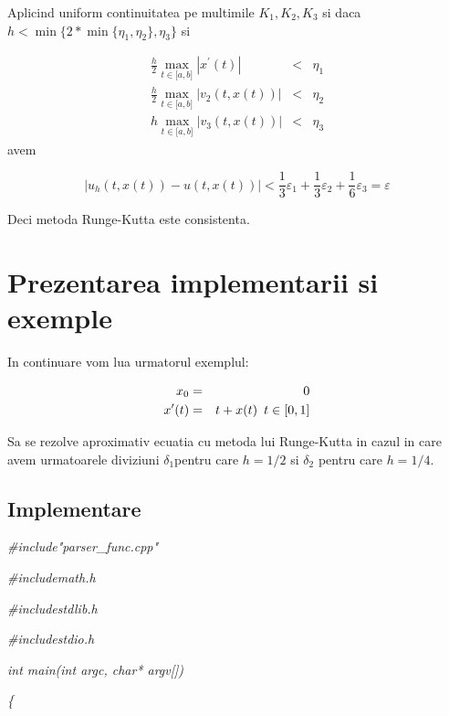 \documentclass[a4paper,twoside]{book}
\begin{document}
Aplicind uniform continuitatea pe multimile $K_{1},K_{2},K_{3}$ si daca $%
h<\min \{2\ast \min \{\eta _{1},\eta _{2}\},\eta _{3}\}$ si

\begin{eqnarray*}
\frac{h}{2}\max_{t\in \lbrack a,b]}\left\vert x^{\prime }(t)\right\vert
&<&\eta _{1} \\
\frac{h}{2}\max_{t\in \lbrack a,b]}\left\vert v_{2}(t,x(t))\right\vert
&<&\eta _{2} \\
h\max_{t\in \lbrack a,b]}\left\vert v_{3}(t,x(t))\right\vert &<&\eta _{3}
\end{eqnarray*}%
avem

\begin{equation*}
\left\vert u_{h}(t,x(t))-u(t,x(t))\right\vert <\frac{1}{3}\varepsilon _{1}+%
\frac{1}{3}\varepsilon _{2}+\frac{1}{6}\varepsilon _{3}=\varepsilon
\end{equation*}

Deci metoda Runge-Kutta este consistenta.

\section{Prezentarea implementarii si exemple}

In continuare vom lua urmatorul exemplul:

\begin{eqnarray*}
x_{0} &=&0 \\
x^{\prime }(t) &=&t+x(t)\text{\thinspace \thinspace \thinspace }t\in \lbrack
0,1]
\end{eqnarray*}

Sa se rezolve aproximativ ecuatia cu metoda lui Runge-Kutta in cazul in care
avem urmatoarele diviziuni $\delta _{1}$pentru care $h=1/2$ si $\delta _{2}$
pentru care $h=1/4$.

\subsection{Implementare}

\textit{\#include"parser\_func.cpp"}

\textit{\#include\TEXTsymbol{<}math.h\TEXTsymbol{>}}

\textit{\#include\TEXTsymbol{<}stdlib.h\TEXTsymbol{>}}

\textit{\#include\TEXTsymbol{<}stdio.h\TEXTsymbol{>}}

\textit{int main(int argc, char* argv[])}

\textit{\{}
\end{document}
